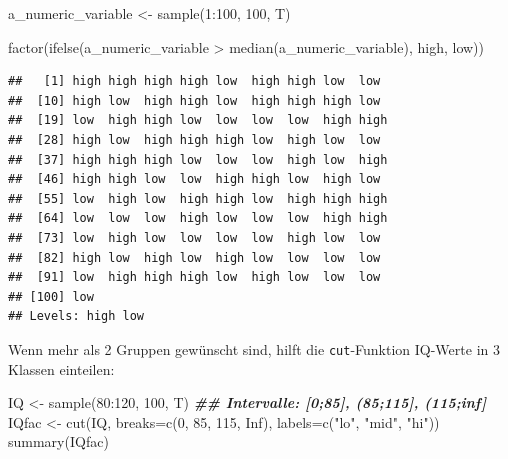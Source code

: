\documentclass[
]{book}
\newenvironment{Shaded}{\begin{snugshade}}{\end{snugshade}}
\newcommand{\AttributeTok}[1]{\textcolor[rgb]{0.77,0.63,0.00}{#1}}
\newcommand{\ConstantTok}[1]{\textcolor[rgb]{0.00,0.00,0.00}{#1}}
\newcommand{\DecValTok}[1]{\textcolor[rgb]{0.00,0.00,0.81}{#1}}
\newcommand{\DocumentationTok}[1]{\textcolor[rgb]{0.56,0.35,0.01}{\textbf{\textit{#1}}}}
\newcommand{\FunctionTok}[1]{\textcolor[rgb]{0.00,0.00,0.00}{#1}}
\newcommand{\NormalTok}[1]{#1}
\newcommand{\OtherTok}[1]{\textcolor[rgb]{0.56,0.35,0.01}{#1}}
\newcommand{\SpecialCharTok}[1]{\textcolor[rgb]{0.00,0.00,0.00}{#1}}
\newcommand{\StringTok}[1]{\textcolor[rgb]{0.31,0.60,0.02}{#1}}
\begin{document}
\begin{Shaded}
\begin{Highlighting}[]
\NormalTok{a\_numeric\_variable }\OtherTok{\textless{}{-}} \FunctionTok{sample}\NormalTok{(}\DecValTok{1}\SpecialCharTok{:}\DecValTok{100}\NormalTok{, }\DecValTok{100}\NormalTok{, T)}


\FunctionTok{factor}\NormalTok{(}\FunctionTok{ifelse}\NormalTok{(a\_numeric\_variable }\SpecialCharTok{\textgreater{}} \FunctionTok{median}\NormalTok{(a\_numeric\_variable),}
              \StringTok{\textquotesingle{}high\textquotesingle{}}\NormalTok{,}
              \StringTok{\textquotesingle{}low\textquotesingle{}}\NormalTok{))}
\end{Highlighting}
\end{Shaded}

\begin{verbatim}
##   [1] high high high high low  high high low  low 
##  [10] high low  high high low  high high high low 
##  [19] low  high high low  low  low  low  high high
##  [28] high low  high high high low  high low  low 
##  [37] high high high low  low  low  high low  high
##  [46] high high low  low  high high low  high low 
##  [55] low  high low  high high low  high high high
##  [64] low  low  low  high low  low  low  high high
##  [73] low  high low  low  low  low  high low  low 
##  [82] high low  high low  high low  low  low  low 
##  [91] low  high high high low  high low  low  low 
## [100] low 
## Levels: high low
\end{verbatim}

Wenn mehr als 2 Gruppen gewünscht sind, hilft die \texttt{cut}-Funktion
IQ-Werte in 3 Klassen einteilen:

\begin{Shaded}
\begin{Highlighting}[]
\NormalTok{IQ }\OtherTok{\textless{}{-}} \FunctionTok{sample}\NormalTok{(}\DecValTok{80}\SpecialCharTok{:}\DecValTok{120}\NormalTok{, }\DecValTok{100}\NormalTok{, T)}
\DocumentationTok{\#\# Intervalle: [0;85], (85;115], (115;inf]}
\NormalTok{IQfac }\OtherTok{\textless{}{-}} \FunctionTok{cut}\NormalTok{(IQ, }\AttributeTok{breaks=}\FunctionTok{c}\NormalTok{(}\DecValTok{0}\NormalTok{, }\DecValTok{85}\NormalTok{, }\DecValTok{115}\NormalTok{, }\ConstantTok{Inf}\NormalTok{), }
             \AttributeTok{labels=}\FunctionTok{c}\NormalTok{(}\StringTok{"lo"}\NormalTok{, }\StringTok{"mid"}\NormalTok{, }\StringTok{"hi"}\NormalTok{))}
\FunctionTok{summary}\NormalTok{(IQfac)}
\end{Highlighting}
\end{Shaded}
\end{document}
